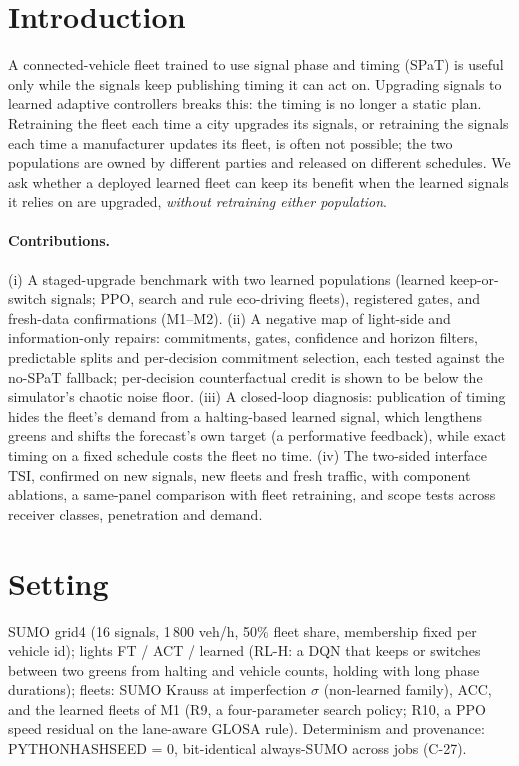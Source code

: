 \documentclass[11pt]{article}
\begin{document}
\section{Introduction}
A connected-vehicle fleet trained to use signal phase and timing (SPaT) is useful only while the signals keep publishing timing it can act
on. Upgrading signals to learned adaptive controllers breaks this: the timing is no longer a static plan. Retraining the fleet each time a
city upgrades its signals, or retraining the signals each time a manufacturer updates its fleet, is often not possible; the two populations
are owned by different parties and released on different schedules. We ask whether a deployed learned fleet can keep its benefit when the
learned signals it relies on are upgraded, \emph{without retraining either population}.
\paragraph{Contributions.}
(i) A staged-upgrade benchmark with two learned populations (learned keep-or-switch signals; PPO, search and rule eco-driving fleets),
registered gates, and fresh-data confirmations (M1--M2).
(ii) A negative map of light-side and information-only repairs: commitments, gates, confidence and horizon filters, predictable splits and
per-decision commitment selection, each tested against the no-SPaT fallback; per-decision counterfactual credit is shown to be below the
simulator's chaotic noise floor.
(iii) A closed-loop diagnosis: publication of timing hides the fleet's demand from a halting-based learned signal, which lengthens greens and
shifts the forecast's own target (a performative feedback), while exact timing on a fixed schedule costs the fleet no time.
(iv) The two-sided interface TSI, confirmed on new signals, new fleets and fresh traffic, with component ablations, a same-panel comparison
with fleet retraining, and scope tests across receiver classes, penetration and demand.

\section{Setting}
SUMO grid4 (16 signals, 1\,800 veh/h, 50\% fleet share, membership fixed per vehicle id); lights FT / ACT / learned (RL-H: a DQN that
keeps or switches between two greens from halting and vehicle counts, holding with long phase durations); fleets: SUMO Krauss at
imperfection $\sigma$ (non-learned family), ACC, and the learned fleets of M1 (R9, a four-parameter search policy; R10, a PPO speed
residual on the lane-aware GLOSA rule). Determinism and provenance: PYTHONHASHSEED = 0, bit-identical always-SUMO across jobs (C-27).
\end{document}
